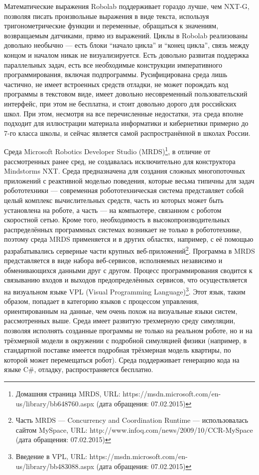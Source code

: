 Математические выражения Robolab поддерживает гораздо лучше, чем NXT-G, позволяя писать 
произвольные выражения в виде текста, используя тригонометрические функции и переменные, 
обращаться к значениям, возвращаемым датчиками, прямо из выражений. Циклы в Robolab 
реализованы довольно необычно --- есть блоки "`начало цикла"' и "`конец цикла"', связь 
между концом и началом никак не визуализируется. Есть довольно развитая поддержка 
параллельных задач, есть все необходимые конструкции императивного программирования, 
включая подпрограммы. Русифицирована среда лишь частично, не имеет встроенных средств 
отладки, не может порождать код программы в текстовом виде, имеет довольно несовременный 
пользовательский интерфейс, при этом не бесплатна, и стоит довольно дорого для российских 
школ. При этом, несмотря на все перечисленные недостатки, эта среда вполне подходит 
для иллюстрации материала информатики и кибернетики примерно до 7-го класса школы,
и сейчас является самой распространённой в школах России.

Среда Microsoft Robotics Developer Studio 
(MRDS)\footnote{Домашняя страница MRDS, URL: https://msdn.microsoft.com/en-us/library/bb648760.aspx (дата обращения: 07.02.2015)}, 
в отличие от рассмотренных ранее сред, не создавалась исключительно для конструктора 
Mindstorms NXT. Среда предназначена для создания сложных многопоточных приложений с 
реактивной моделью поведения, которые весьма типичны для задач робототехники --- современная 
робототехническая система представляет собой целый комплекс вычислительных средств, 
часть из которых может быть установлена на роботе, а часть --- на компьютере, связанном 
с роботом скоростной сетью. Кроме того, необходимость в высокопроизводительных распределённых 
программных системах возникает не только в робототехнике, поэтому среда MRDS применяется 
и в других областях, например, с её помощью разрабатывались серверные части крупных 
веб-приложений\footnote{Часть MRDS --- Concurrency and Coordination Runtime --- использовалась сайтом MySpace,
URL: http://www.infoq.com/news/2009/10/CCR-MySpace (дата обращения: 07.02.2015)}. 
Программа в MRDS представляется в виде набора веб-сервисов, исполняемых независимо 
и обменивающихся данными друг с другом. Процесс программирования сводится к связыванию 
входов и выходов предопределённых сервисов, что осуществляется на визуальном языке 
VPL (Visual Programming Language)\footnote{Введение в VPL, URL: https://msdn.microsoft.com/en-us/library/bb483088.aspx (дата обращения: 07.02.2015)}. 
Этот язык, таким образом, попадает в категорию языков с процессом управления, ориентированным 
на данные, чем очень похож на визуальные языки систем, рассмотренных выше. Среда имеет 
развитую трехмерную среду симуляции, позволяя исполнять созданные программы не только 
на реальном роботе, но и на трёхмерной модели в окружении с подробной симуляцией физики 
(например, в стандартной поставке имеется подробная трёхмерная модель квартиры, по которой 
может перемещаться робот). Среда поддерживает генерацию кода на языке C\#, отладку, 
распространяется бесплатно.


